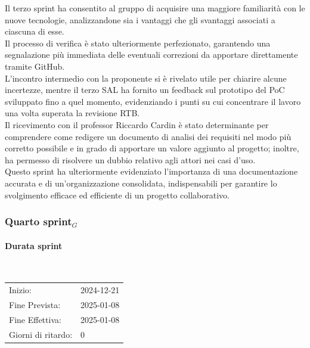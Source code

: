 \documentclass[10pt]{article}
\begin{document}
{{{{    Il terzo sprint ha consentito al gruppo di acquisire una maggiore familiarità con le nuove tecnologie, analizzandone sia i vantaggi che gli svantaggi associati a ciascuna di esse.\\
    Il processo di verifica è stato ulteriormente perfezionato, garantendo una segnalazione più immediata delle eventuali correzioni da apportare direttamente tramite GitHub.\\
    L'incontro intermedio con la proponente si è rivelato utile per chiarire alcune incertezze, mentre il terzo SAL ha fornito un feedback sul prototipo del PoC sviluppato fino a quel momento, evidenziando i punti su cui concentrare il lavoro una volta superata la revisione RTB.\\
    Il ricevimento con il professor Riccardo Cardin è stato determinante per comprendere come redigere un documento di analisi dei requisiti nel modo più corretto possibile e in grado di apportare un valore aggiunto al progetto; inoltre, ha permesso di risolvere un dubbio relativo agli attori nei casi d'uso.\\
    Questo sprint ha ulteriormente evidenziato l'importanza di una documentazione accurata e di un'organizzazione consolidata, indispensabili per garantire lo svolgimento efficace ed efficiente di un progetto collaborativo.


\newpage
\subsubsection{Quarto sprint$_G$}
\label{quarto-sprint$_G$}
    
    \paragraph{Durata sprint}\mbox{}\\
    \vspace{-1.5em}
    \begin{table}[h] 
    \renewcommand{\arraystretch}{1.2}  
    \begin{tabular}{ l l }
        Inizio: & 2024-12-21 \\
        Fine Prevista: & 2025-01-08 \\
        Fine Effettiva: & 2025-01-08 \\
        Giorni di ritardo: & 0 \\
    \end{tabular}
    \end{table}
    \vspace{-2em}
    {\renewcommand{\arraystretch}{1.5}%
    
}}}}}
\end{document}
